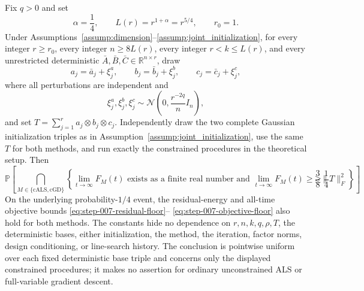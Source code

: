 \begin{proposition}\label{prop:step-007-material-partial}
Fix $q>0$ and set
\[
 \alpha=\frac14,
 \qquad
 L(r)=r^{1+\alpha}=r^{5/4},
 \qquad
 r_0=1.
\]
Under Assumptions~\ref{assump:dimension}--\ref{assump:joint_initialization},
for every integer $r\ge r_0$, every integer $n\ge8L(r)$, every integer
$r<k\le L(r)$, and every unrestricted deterministic
$\bar A,\bar B,\bar C\in\mathbb R^{n\times r}$, draw
\[
 a_j=\bar a_j+\xi_j^a,
 \qquad b_j=\bar b_j+\xi_j^b,
 \qquad c_j=\bar c_j+\xi_j^c,
\]
where all perturbations are independent and
\[
 \xi_j^a,\xi_j^b,\xi_j^c
 \sim\mathcal N\!\left(0,\frac{r^{-2q}}{n}I_n\right),
\]
and set $T=\sum_{j=1}^r a_j\otimes b_j\otimes c_j$.  Independently draw
the two complete Gaussian initialization triples as in
Assumption~\ref{assump:joint_initialization}, use the same $T$ for both
methods, and run exactly the constrained procedures in the theoretical setup.
Then
\[
 \mathbb P\!\left[
 \bigcap_{M\in\{\mathrm{cALS},\mathrm{cGD}\}}
 \left\{
 \lim_{t\to\infty}F_M(t)\text{ exists as a finite real number and }
 \lim_{t\to\infty}F_M(t)\ge\frac38\|T\|_F^2
 \right\}
 \right]\ge\frac14.
 \tag{A.19}\label{eq:step-007-final-event}
\]
On the underlying probability-$1/4$ event, the residual-energy and all-time
objective bounds \eqref{eq:step-007-residual-floor}--
\eqref{eq:step-007-objective-floor} also hold for both methods.  The constants
hide no dependence on $r,n,k,q,\rho,T$, the deterministic bases, either
initialization, the method, the iteration, factor norms, design conditioning,
or line-search history.  The conclusion is pointwise uniform over each fixed
deterministic base triple and concerns only the displayed constrained
procedures; it makes no assertion for ordinary unconstrained ALS or
full-variable gradient descent.
\end{proposition}


